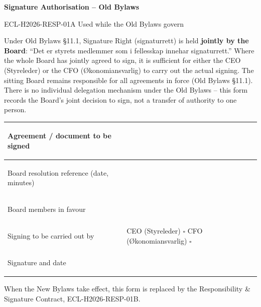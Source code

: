 \documentclass{../../../Common/Latex/Templates/rapport}
\date{\meetingdate, \meetingtime}
\begin{document}
\reportmainmatter
\small
\setlength{\parindent}{0pt}
\setlength{\tabcolsep}{6pt}
\renewcommand{\arraystretch}{1.2}

\begin{center}
  {\Large\bfseries Signature Authorisation -- Old Bylaws}\par
  \vspace{0.15cm}
  {\normalsize ECL-H2026-RESP-01A \textperiodcentered{} Used while the Old Bylaws govern}\par
  \vspace{0.1cm}
  {\small \meetingline}\par
\end{center}

\vspace{0.2cm}
Under Old Bylaws \S11.1, Signature Right (signaturrett) is held \textbf{jointly by the Board}: ``Det er styrets medlemmer som i fellesskap innehar signaturrett.'' Where the whole Board has jointly agreed to sign, it is sufficient for either the CEO (Styreleder) or the CFO (Økonomiansvarlig) to carry out the actual signing. The sitting Board remains responsible for all agreements in force (Old Bylaws \S11.1). There is no individual delegation mechanism under the Old Bylaws -- this form records the Board's joint decision to sign, not a transfer of authority to one person.

\vspace{0.4cm}
\begin{tabularx}{\textwidth}{|>{\bfseries\raggedright\arraybackslash}p{4.5cm}|X|}
  \hline
  Agreement / document to be signed          & \rule{0pt}{1.4cm}                                                                                   \\
  \hline
  Board resolution reference (date, minutes) & \rule{0pt}{1.2cm}                                                                                   \\
  \hline
  Board members in favour                    & \rule{0pt}{1.4cm}                                                                                   \\
  \hline
  Signing to be carried out by               & \rule{0pt}{0.9cm}CEO (Styreleder) \quad $\square$ \quad\quad CFO (Økonomiansvarlig) \quad $\square$ \\
  \hline
  Signature and date                         & \rule{0pt}{1.6cm}                                                                                   \\
  \hline
\end{tabularx}

\vfill
When the New Bylaws take effect, this form is replaced by the Responsibility \& Signature Contract, ECL-H2026-RESP-01B.
\end{document}
